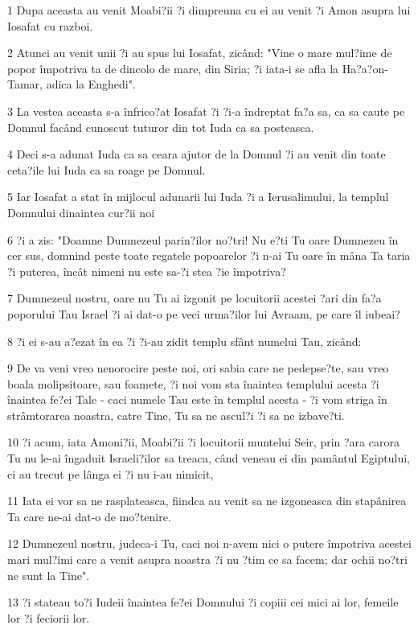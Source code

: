 \par 1 Dupa aceasta au venit Moabi?ii ?i dimpreuna cu ei au venit ?i Amon asupra lui Iosafat cu razboi.
\par 2 Atunci au venit unii ?i au spus lui Iosafat, zicând: "Vine o mare mul?ime de popor împotriva ta de dincolo de mare, din Siria; ?i iata-i se afla la Ha?a?on-Tamar, adica la Enghedi".
\par 3 La vestea aceasta s-a înfrico?at Iosafat ?i ?i-a îndreptat fa?a sa, ca sa caute pe Domnul facând cunoscut tuturor din tot Iuda ca sa posteasca.
\par 4 Deci s-a adunat Iuda ca sa ceara ajutor de la Domnul ?i au venit din toate ceta?ile lui Iuda ca sa roage pe Domnul.
\par 5 Iar Iosafat a stat în mijlocul adunarii lui Iuda ?i a Ierusalimului, la templul Domnului dinaintea cur?ii noi
\par 6 ?i a zis: "Doamne Dumnezeul parin?ilor no?tri! Nu e?ti Tu oare Dumnezeu în cer sus, domnind peste toate regatele popoarelor ?i n-ai Tu oare în mâna Ta taria ?i puterea, încât nimeni nu este sa-?i stea ?ie împotriva?
\par 7 Dumnezeul nostru, oare nu Tu ai izgonit pe locuitorii acestei ?ari din fa?a poporului Tau Israel ?i ai dat-o pe veci urma?ilor lui Avraam, pe care îl iubeai?
\par 8 ?i ei s-au a?ezat în ea ?i ?i-au zidit templu sfânt numelui Tau, zicând:
\par 9 De va veni vreo nenorocire peste noi, ori sabia care ne pedepse?te, sau vreo boala molipsitoare, sau foamete, ?i noi vom sta înaintea templului acesta ?i înaintea fe?ei Tale - caci numele Tau este în templul acesta - ?i vom striga în strâmtorarea noastra, catre Tine, Tu sa ne ascul?i ?i sa ne izbave?ti.
\par 10 ?i acum, iata Amoni?ii, Moabi?ii ?i locuitorii muntelui Seir, prin ?ara carora Tu nu le-ai îngaduit Israeli?ilor sa treaca, când veneau ei din pamântul Egiptului, ci au trecut pe lânga ei ?i nu i-au nimicit,
\par 11 Iata ei vor sa ne rasplateasca, fiindca au venit sa ne izgoneasca din stapânirea Ta care ne-ai dat-o de mo?tenire.
\par 12 Dumnezeul nostru, judeca-i Tu, caci noi n-avem nici o putere împotriva acestei mari mul?imi care a venit asupra noastra ?i nu ?tim ce sa facem; dar ochii no?tri ne sunt la Tine".
\par 13 ?i stateau to?i Iudeii înaintea fe?ei Domnului ?i copiii cei mici ai lor, femeile lor ?i feciorii lor.
